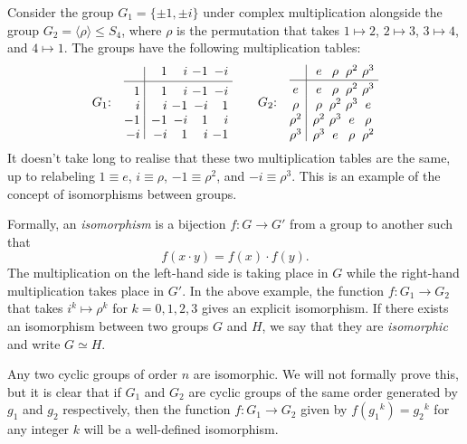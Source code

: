 Consider the group $G_1 = \{\pm 1, \pm i\}$ under complex multiplication alongside the group $G_2 = \langle\rho\rangle\leq S_4$, where $\rho$ is the permutation that takes $1\mapsto 2$, $2\mapsto 3$, $3\mapsto 4$, and $4\mapsto 1$. The groups have the following multiplication tables:
$$G_1{\rm :}\quad\vcenter{\vbox{\offinterlineskip
    \halign{
        \hfil $#$ & \hfil\vrule# \hfil \enskip &
        \hfil $#$ & \hfil $#$ & \hfil $#$ & \hfil $#$ \cr
        && 1 & i & -1 & -i \cr
        & height4pt &&& \cr
        \noalign{\hrule}
        & height4pt &&&\cr
        1 && 1 & i & -1 & -i \cr
        & height4pt &&&\cr
        i && i & -1 & -i & 1 \cr
        & height4pt &&&\cr
        -1 && -1 & -i & 1 & i \cr
        & height4pt &&&\cr
        -i && -i & 1 & i & -1 \cr
    }
}} \qquad
G_2{\rm :}\quad\vcenter{\vbox{\offinterlineskip
    \halign{
        \hfil $#$ \hfil & \hfil\vrule# \hfil \enskip &
        \hfil $#$ \hfil & \hfil $#$ \hfil & \hfil $#$ \hfil & \hfil $#$ \hfil \cr
        && e & \rho & \rho^2 & \rho^3 \cr
        & height2pt &&& \cr
        \noalign{\hrule}
        & height2pt &&&\cr
        e && e & \rho & \rho^2 & \rho^3 \cr
        & height2pt &&&\cr
        \rho && \rho & \rho^2 & \rho^3 & e \cr
        & height2pt &&&\cr
        \rho^2 && \rho^2 & \rho^3 & e & \rho \cr
        & height2pt &&&\cr
        \rho^3 && \rho^3 & e & \rho & \rho^2 \cr
    }
}}
$$
It doesn't take long to realise that these two multiplication tables are the same, up to relabeling $1 \equiv e$, $i\equiv \rho$, $-1 \equiv \rho^2$, and $-i \equiv \rho^3$. This is an example of the concept of isomorphisms between groups.

Formally, an {\it isomorphism} is a bijection $f:G\rightarrow G'$ from a group to another such that
$$f(x\cdot y) = f(x) \cdot f(y).$$
The multiplication on the left-hand side is taking place in $G$ while the right-hand multiplication takes place in $G'$. In the above example, the function $f : G_1 \rightarrow G_2$ that takes $i^k \mapsto \rho^k$ for $k=0,1,2,3$ gives an explicit isomorphism. If there exists an isomorphism between two groups $G$ and $H$, we say that they are {\it isomorphic} and write $G\simeq H$.

Any two cyclic groups of order $n$ are isomorphic. We will not formally prove this, but it is clear that if $G_1$ and $G_2$ are cyclic groups of the same order generated by $g_1$ and $g_2$ respectively, then the function $f : G_1 \rightarrow G_2$ given by $f({g_1}^k) = {g_2}^k$ for any integer $k$ will be a well-defined isomorphism.

